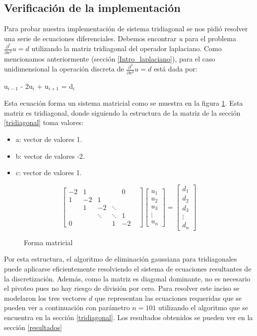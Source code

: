 \subsection{Verificación de la implementación}
Para probar nuestra implementación de sistema tridiagonal se nos pidió resolver una serie de ecuaciones diferenciales. Debemos encontrar \textit{u} para el problema $\frac{\partial^2}{\partial x^2}u = d$ utilizando la matriz tridiagonal del operador laplaciano.
Como mencionamos anteriormente (sección \ref{Intro_laplaciano}), para el caso unidimensional la operación discreta de $\frac{\partial^2}{\partial x^2}u = d$ está dada por:

u$_{i-1}$ - 2u$_{i}$ + u$_{i+1}$ = d$_{i}$

Esta ecuación forma un sistema matricial como se muestra en la figura \ref{laplaciano}. Esta matriz es tridiagonal, donde siguiendo la estructura de la matriz de la sección \ref{tridiagonal} toma valores:

\begin{itemize}
    \item a: vector de valores 1.
    \item b: vector de valores -2.
    \item c: vector de valores 1.
\end{itemize}

\begin{figure}[H]
    \[ \begin{bmatrix}
-2 & 1 & & & 0\\
1 & -2 & 1 & & & \\
    & 1 & -2 & \ddots & \\
    &    & \ddots &  \ddots & 1\\
0   &    &   & 1 & -2
     \end{bmatrix}
     \begin{bmatrix}
           u_{1}\\
           u_{2} \\
           u_{3}\\ 
           \vdots\\ 
           u_{n}  
     \end{bmatrix}
      =
     \begin{bmatrix}
          d_{1} \\
          d_{2}\\
          d_{3}\\
         \vdots\\ 
         d_{n}  
     \end{bmatrix} \]
     \caption{Forma matricial}\label{laplaciano}
\end{figure}
Por esta estructura,  el algoritmo de eliminación gaussiana para tridiagonales puede aplicarse eficientemente resolviendo el sistema de ecuaciones resultantes de la discretización. Además, como la matriz es diagonal dominante, no es necesario el pivoteo pues no hay riesgo de división por cero. 
Para resolver este inciso se modelaron los tres vectores $d$ que representan las ecuaciones requeridas que se pueden ver a continuación con parámetro $n=101$ utilizando el algoritmo que se encuentra en la sección \ref{tridiagonal}.
Los resultados obtenidos se pueden ver en la sección \ref{resultados} 

